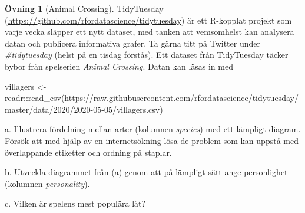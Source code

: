\documentclass[
]{book}
\newenvironment{Shaded}{\begin{snugshade}}{\end{snugshade}}
\newcommand{\FunctionTok}[1]{\textcolor[rgb]{0.00,0.00,0.00}{#1}}
\newcommand{\NormalTok}[1]{#1}
\newcommand{\OtherTok}[1]{\textcolor[rgb]{0.56,0.35,0.01}{#1}}
\newcommand{\SpecialCharTok}[1]{\textcolor[rgb]{0.00,0.00,0.00}{#1}}
\newcommand{\StringTok}[1]{\textcolor[rgb]{0.31,0.60,0.02}{#1}}
\theoremstyle{definition}
\theoremstyle{definition}
\theoremstyle{definition}
\newtheorem{exercise}{Övning}[chapter]
\theoremstyle{definition}
\theoremstyle{remark}
\begin{document}
\begin{exercise}[Animal Crossing]
TidyTuesday (\url{https://github.com/rfordatascience/tidytuesday}) är ett R-kopplat projekt som varje vecka släpper ett nytt dataset, med tanken att vemsomhelst kan analysera datan och publicera informativa grafer. Ta gärna titt på Twitter under \emph{\#tidytuesday} (helst på en tisdag förstås). Ett dataset från TidyTuesday täcker bybor från spelserien \emph{Animal Crossing}. Datan kan läsas in med

\begin{Shaded}
\begin{Highlighting}[]
\NormalTok{villagers }\OtherTok{\textless{}{-}}\NormalTok{ readr}\SpecialCharTok{::}\FunctionTok{read\_csv}\NormalTok{(}\StringTok{\textquotesingle{}https://raw.githubusercontent.com/rfordatascience/tidytuesday/master/data/2020/2020{-}05{-}05/villagers.csv\textquotesingle{}}\NormalTok{)}
\end{Highlighting}
\end{Shaded}

a. Illustrera fördelning mellan arter (kolumnen \emph{species}) med ett lämpligt diagram. Försök att med hjälp av en internetsökning lösa de problem som kan uppstå med överlappande etiketter och ordning på staplar.

b. Utveckla diagrammet från (a) genom att på lämpligt sätt ange personlighet (kolumnen \emph{personality}).

c. Vilken är spelens mest populära låt?
\end{exercise}
\end{document}

